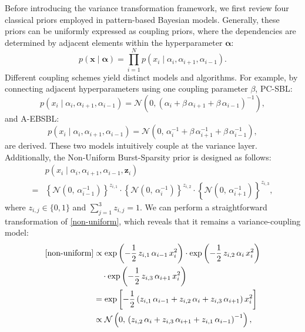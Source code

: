 \documentclass[lettersize,journal]{IEEEtran}
\theoremstyle{remark}
\begin{document}
Before introducing the variance transformation framework, we first review four classical priors employed in pattern-based Bayesian models. Generally, these priors can be uniformly expressed as coupling priors, where the dependencies  are determined by adjacent elements within the hyperparameter \( \boldsymbol{\alpha} \):
\begin{equation}
	p(\mathbf{x} \mid \boldsymbol{\alpha}) = \prod_{i=1}^{N} p\left(x_i \mid \alpha_i, \alpha_{i+1}, \alpha_{i-1}\right).
\end{equation}
Different coupling schemes yield distinct models and algorithms. 
	For example, by connecting adjacent hyperparameters using one coupling parameter \(\beta\), 
PC-SBL:
	\begin{equation}
		p\left(x_i \mid \alpha_i, \alpha_{i+1}, \alpha_{i-1}\right)=\mathcal{N}\left( 0, \left(\alpha_i + \beta\,\alpha_{i+1} + \beta\,\alpha_{i-1}\right)^{-1}\right),\label{PC-SBL}
	\end{equation}
and  A-EBSBL:
	\begin{equation}
		p\left(x_i \mid \alpha_i, \alpha_{i+1}, \alpha_{i-1}\right)=\mathcal{N}\left( 0,\,\alpha_i^{-1} + \beta\,\alpha_{i+1}^{-1} + \beta\,\alpha_{i-1}^{-1}\right), \label{AEBSBL}
	\end{equation}
	are derived.
These two models intuitively couple at the variance layer. 
Additionally, the Non-Uniform Burst-Sparsity prior is designed as follows:
\begin{equation}
	\begin{aligned}
		&p\left(x_i \mid \alpha_i, \alpha_{i+1}, \alpha_{i-1}, \mathbf{z}_i\right)\\
		=&\left\{\mathcal{N}\left( 0,\,\alpha_{i-1}^{-1}\right)\right\}^{z_{i,1}}
		\cdot 
		\left\{\mathcal{N}\left( 0,\,\alpha_i^{-1}\right)\right\}^{z_{i,2}}
	\cdot\left\{\mathcal{N}\left( 0,\,\alpha_{i+1}^{-1}\right)\right\}^{z_{i,3}},\label{non-uniform}
	\end{aligned}
\end{equation}
where \(z_{i,j}\in\{0,1\}\) and \(\sum_{j=1}^{3} z_{i,j}=1\). We can perform a straightforward transformation of \eqref{non-uniform}, which reveals that it remains a variance-coupling model:
	\begin{align}
		\eqref{non-uniform}
		&\propto \exp\left(-\frac{1}{2}\,z_{i,1}\,\alpha_{i-1}\,x_i^2\right)
		\cdot \exp\left(-\frac{1}{2}\,z_{i,2}\,\alpha_i\,x_i^2\right)\notag\\
		&\quad\cdot \exp\left(-\frac{1}{2}\,z_{i,3}\,\alpha_{i+1}\,x_i^2\right)\notag\\
		&=\exp\left[-\frac{1}{2} \left(z_{i,1}\,\alpha_{i-1}+z_{i,2}\,\alpha_i+z_{i,3}\,\alpha_{i+1}\right)x_i^2\right]\notag\\
		&\propto \mathcal{N}\left( 0,\,\left(z_{i,2}\,\alpha_i+z_{i,3}\,\alpha_{i+1}+z_{i,1}\,\alpha_{i-1}\right)^{-1}\right),\label{Non-uniform}
	\end{align}
\end{document}
